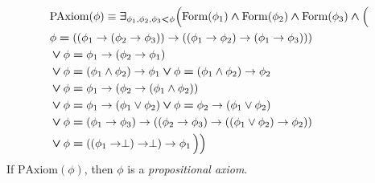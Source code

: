 \documentclass[10pt]{amsart}
\newcommand{\mexists}{\boldsymbol{\exists}}
\newcommand{\mand}{\boldsymbol{\wedge}}
\newcommand{\mor}{\boldsymbol{\vee}}
\newcommand{\mle}{\boldsymbol{<}}
\newcommand{\meq}{\boldsymbol{=}}
\begin{document}
\begin{definition}
$$
\begin{aligned}[t]
&\mathrm{PAxiom}(\phi) \equiv \mexists_{\phi_{\rm{1}},\phi_{\rm{2}},\phi_{\rm{3}} \mle \phi}\Bigl(\mathrm{Form}(\phi_{\rm{1}})\mand \mathrm{Form}(\phi_{\rm{2}}) \mand \mathrm{Form}(\phi_{\rm{3}}) \mand \Bigl(\\ 
&\begin{aligned}[t]
&\phi \meq \left(\left(\phi_{\rm{1}}\ra \left(\phi_{\rm{2}}\ra \phi_{\rm{3}}\right)\right)\ra \left(\left(\phi_{\rm{1}} \ra \phi_{\rm{2}}\right) \ra \left(\phi_{\rm{1}} \ra \phi_{\rm{3}}\right)\right)\right)\\
&\mor \phi \meq \phi_{\rm{1}} \ra \left(\phi_{\rm{2}} \ra \phi_{\rm{1}}\right) \\
&\mor \phi \meq \left(\phi_{\rm{1}} \wedge \phi_{\rm{2}}\right)\ra \phi_{\rm{1}} \mor \phi \meq \left(\phi_{\rm{1}} \wedge \phi_{\rm{2}}\right) \ra \phi_{\rm{2}}\\
&\mor \phi \meq \phi_{\rm{1}} \ra \left(\phi_{\rm{2}} \ra \left(\phi_{\rm{1}} \wedge \phi_{\rm{2}}\right)\right)\\
&\mor \phi \meq \phi_{\rm{1}} \ra \left(\phi_{\rm{1}} \vee \phi_{\rm{2}}\right) \mor \phi \meq \phi_{\rm{2}} \ra \left(\phi_{\rm{1}} \vee \phi_{\rm{2}}\right)\\
&\mor \phi \meq \left(\phi_{\rm{1}} \ra \phi_{\rm{3}}\right) \ra \left(\left(\phi_{\rm{2}} \ra \phi_{\rm{3}}\right) \ra \left(\left(\phi_{\rm{1}} \vee \phi_{\rm{2}}\right)\ra \phi_{\rm{2}}\right)\right)\\
&\mor \phi \meq \left(\left(\phi_{\rm{1}} \ra \perp\right) \ra \perp\right) \ra \phi_{\rm{1}}\, \Bigr)\Bigr)\\
\end{aligned}
\end{aligned}
$$
If $\mathrm{PAxiom}(\phi)$, then $\phi$ is a \textit{propositional axiom}.
\end{definition}
\end{document}
